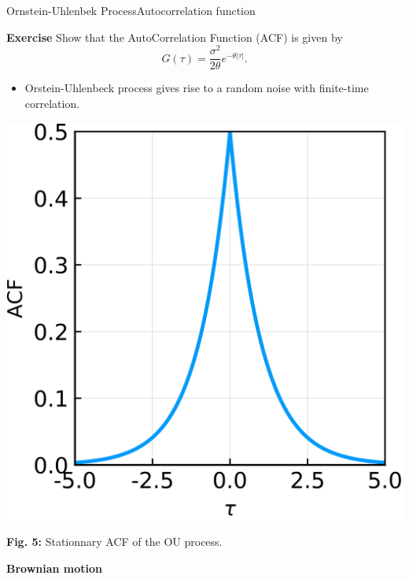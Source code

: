 \documentclass[usenames,dvipsnames,svgnames,10pt,aspectratio=169]{beamer}
\begin{document}
\begin{frame}[t, c]{Ornstein-Uhlenbek Process}{Autocorrelation function}
	\begin{minipage}{.48\textwidth}
		\begin{block}{\centering \textbf{Exercise}}
			Show that the AutoCorrelation Function (ACF) is given by
				$$
				G(\tau) = \frac{\sigma^2}{2\theta} e^{-\theta \vert \tau \vert}.
				$$
		\end{block}

		\bigskip

		\begin{itemize}
			\item Orstein-Uhlenbeck process gives rise to a random noise with finite-time correlation.
		\end{itemize}
	\end{minipage}%
	\hfill
	\begin{minipage}{.48\textwidth}
		\centering
		\includegraphics[width=.75\columnwidth]{ornstein_uhlenbeck_process_acf}

		\small{
			\textbf{Fig. 5:} Stationnary ACF of the OU process.
			}
	\end{minipage}

	\vspace{1cm}

\end{frame}


\begin{frame}[t, c]{}
	\centering
	\vspace{1cm}

	{\Large \textbf{Brownian motion}}

	\bigskip

	{}

\end{frame}
\end{document}
